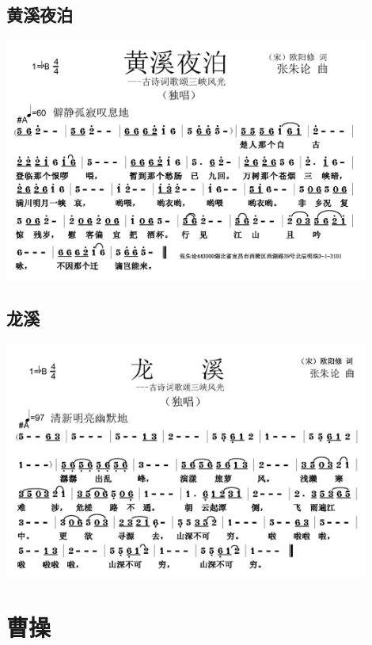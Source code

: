\documentclass[cn,pad,twocol]{elegantbook}
\begin{document}
\section{黄溪夜泊} \includegraphics[width=0.9\textwidth]{rpi400/20210212欧阳修-黄溪夜泊.png}
\section{龙溪} \includegraphics[width=0.9\textwidth]{rpi400/20210212欧阳修-龙溪.png}


\chapter{曹操}
\end{document}
